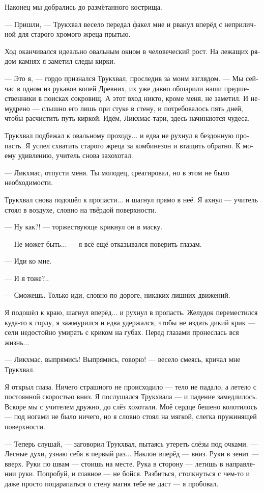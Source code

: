 \documentclass[a4paper,12pt,fleqn]{book}\usepackage{cooltooltips}\usepackage{polyglossia}\setdefaultlanguage[babelshorthands=true]{russian}\setotherlanguage{english}\defaultfontfeatures{Ligatures=TeX,Mapping=tex-text} \usepackage{xcolor}\definecolor{lightgray}{HTML}{bbbbbb}\color{lightgray}\newcommand{\ml}[3]{\textenglish{\textcolor{black}{#3}}}
\begin{document}
{Наконец мы добрались до размётанного кострища.

--- Пришли, --- Трукхвал весело передал факел мне и рванул вперёд с неприличной для старого хромого жреца прытью.

Ход оканчивался идеально овальным окном в человеческий рост.
На лежащих рядом камнях я заметил следы кирки.

--- Это я, --- гордо признался Трукхвал, проследив за моим взглядом.
--- Мы сейчас в одном из рукавов копей Древних, их уже давно обшарили наши предшественники в поисках сокровищ.
А этот вход никто, кроме меня, не заметил.
И немудрено --- слышно его лишь при стуке в стену, и потребовалось пять дней, чтобы расчистить путь киркой.
Идём, Ликхмас-тари, здесь начинаются чудеса.

Трукхвал подбежал к овальному проходу... и едва не рухнул в бездонную пропасть.
Я успел схватить старого жреца за комбинезон и втащить обратно.
К моему удивлению, учитель снова захохотал.

--- Ликхмас, отпусти меня.
Ты молодец, среагировал, но в этом не было необходимости.

Трукхвал снова подошёл к пропасти... и шагнул прямо в неё.
Я ахнул --- учитель стоял в воздухе, словно на твёрдой поверхности.

--- Ну как?! --- торжествующе крикнул он в маску.

--- Не может быть... --- я всё ещё отказывался поверить глазам.

--- Иди ко мне.

--- И я тоже?..

--- Сможешь.
Только иди, словно по дороге, никаких лишних движений.

Я подошёл к краю, шагнул вперёд... и рухнул в пропасть.
Желудок переместился куда-то к горлу, я зажмурился и едва удержался, чтобы не издать дикий крик --- сели недостойно умирать с криком на губах.
Перед глазами пронеслась вся жизнь...

--- Ликхмас, выпрямись!
Выпрямись, говорю! --- весело смеясь, кричал мне Трукхвал.

Я открыл глаза.
Ничего страшного не происходило --- тело не падало, а летело с постоянной скоростью вниз.
Я послушался Трукхвала --- и падение замедлилось.
Вскоре мы с учителем дружно, до слёз хохотали.
Моё сердце бешено колотилось --- под ногами не было ничего, но я словно стоял на мягкой, слегка пружинящей поверхности.

--- Теперь слушай, --- заговорил Трукхвал, пытаясь утереть слёзы под очками.
--- Лесные духи, узнаю себя в первый раз...
Наклон вперёд --- вниз.
Руки в зенит --- вверх.
Руки по швам --- стоишь на месте.
Рука в сторону --- летишь в направлении руки.
Попробуй, и главное --- не бойся.
Разбиться, столкнуться с чем-то и даже просто поцарапаться о стену магия тебе не даст --- я пробовал.

}
\end{document}
